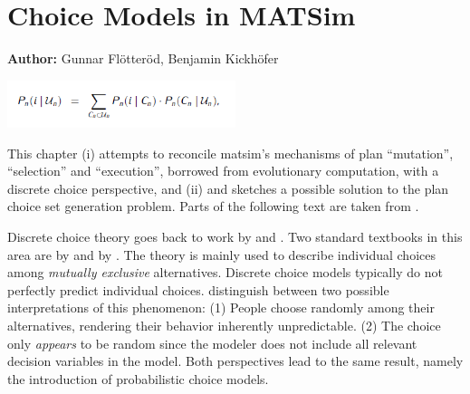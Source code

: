 \chapter{Choice Models in MATSim}
\label{ch:discretechoice}

\hfill \textbf{Author:} Gunnar Flötteröd, Benjamin Kickhöfer


\begin{center} \includegraphics[width=0.5\textwidth, angle=0]{understanding/figures/dc.png} \end{center}

This chapter (i) attempts to reconcile \gls{matsim}'s mechanisms of plan
{}``mutation'', {}``selection'' and {}``execution'', borrowed from evolutionary computation, with a 
discrete choice perspective, and (ii) and sketches a possible solution to the
plan choice set generation problem. Parts of the following text are taken from \citet[][Section~2.3]{Kickhoefer_PhDThesis_2014}.

Discrete choice theory goes back to work by \citet{Luce1965PreferenceUtility} and 
\citet{McFadden1975DiscreteChoiceModel}. Two standard textbooks in this area are by
\citet{BenAkivaLerman_1985} and by \citet{Train_2003}. The theory is mainly used 
to describe individual choices among \emph{mutually exclusive} alternatives. 
Discrete choice models typically do not perfectly predict individual choices.
\citet{Luce1965PreferenceUtility} distinguish between two possible interpretations of this phenomenon:
(1) People choose randomly among their alternatives, rendering their behavior inherently unpredictable.
(2) The choice only \emph{appears} to be random since the modeler does not include all relevant 
decision variables in the model. 
Both perspectives lead to the same result, namely the %
introduction
of probabilistic choice models.

